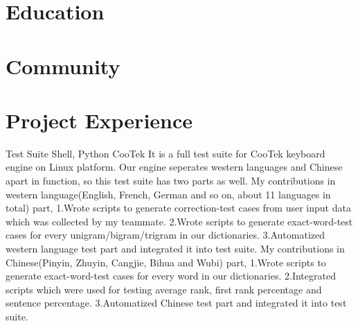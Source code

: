 \documentclass[11pt,a4paper]{moderncv}
\begin{document}
\maketitle

\section{Education}


\section{Community}

\section{Project Experience}
{Test Suite}
{Shell, Python}{}
{CooTek}
{
It is a full test suite for CooTek keyboard engine on Linux platform.
Our engine seperates western languages and Chinese apart in function, so this test suite has two parts as well.
\newline My contributions in western language(English, French, German and so on, about 11 languages in total) part,
\newline 1.Wrote scripts to generate correction-test cases from user input data which was collected by my teammate.
\newline 2.Wrote scripts to generate exact-word-test cases for every unigram/bigram/trigram in our dictionaries.
\newline 3.Automatized western language test part and integrated it into test suite.
\newline My contributions in Chinese(Pinyin, Zhuyin, Cangjie, Bihua and Wubi) part,
\newline 1.Wrote scripts to generate exact-word-test cases for every word in our dictionaries.
\newline 2.Integrated scripts which were used for testing average rank, first rank percentage and sentence percentage.
\newline 3.Automatized Chinese test part and integrated it into test suite.
\newline
}
\end{document}
